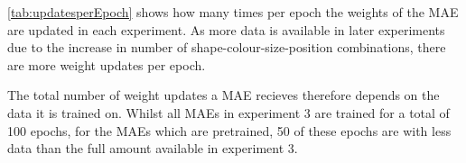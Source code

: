 \autoref{tab:updatesperEpoch} shows how many times per epoch the weights of the MAE are updated in each experiment. As more data is available in later experiments due to the increase in number of shape-colour-size-position combinations, there are more weight updates per epoch. 

The total number of weight updates a MAE recieves therefore depends on the data it is trained on. Whilst all MAEs in experiment 3 are trained for a total of 100 epochs, for the MAEs which are pretrained, 50 of these epochs are with less data than the full amount available in experiment 3.


%
%
